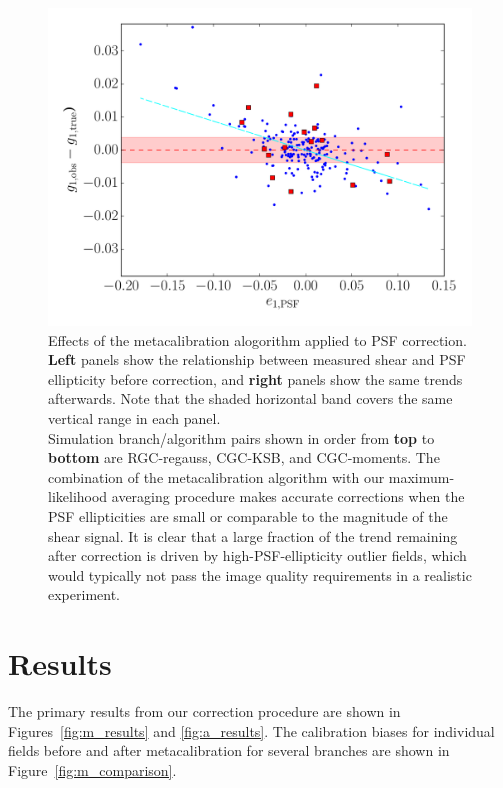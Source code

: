 \documentclass[iop]{emulateapj}
\begin{document}
\begin{figure}
\begin{center}
\includegraphics[width=0.4\linewidth]{./Plots/psf_e1-moments-opt-shear_plots.pdf}
\end{center}
\caption{Effects of the metacalibration alogorithm applied to PSF
  correction. {\bf Left} panels show the relationship between measured
  shear and PSF ellipticity before correction, and {\bf right} panels
  show the same trends afterwards. Note that the shaded horizontal
  band covers the same vertical range in each panel.  \\
  Simulation branch/algorithm pairs shown in order from {\bf top} to
  {\bf bottom} are RGC-regauss, CGC-KSB, and CGC-moments. The
  combination of the metacalibration algorithm with our
  maximum-likelihood averaging procedure makes accurate corrections
  when the PSF ellipticities are small or comparable to the magnitude
  of the shear signal. It is clear that a large fraction of the trend
  remaining after correction is driven by high-PSF-ellipticity outlier
  fields, which would typically not pass the image quality
  requirements in a realistic experiment.}
\label{fig:psf_trends}
\end{figure}



\section{Results}
The primary results from our correction procedure are shown in
Figures~\ref{fig:m_results} and \ref{fig:a_results}. The calibration
biases for individual fields before and after metacalibration for
several branches are shown in Figure~\ref{fig:m_comparison}. 
\end{document}
